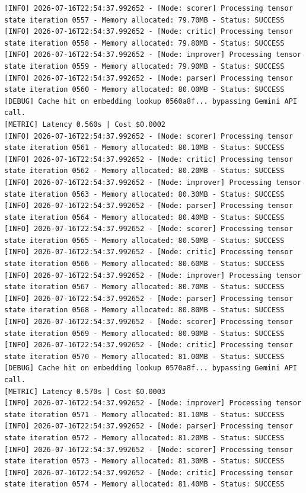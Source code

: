 \documentclass[10pt,journal,compsoc]{IEEEtran}
\begin{document}
\begin{verbatim}
[INFO] 2026-07-16T22:54:37.992652 - [Node: scorer] Processing tensor state iteration 0557 - Memory allocated: 79.70MB - Status: SUCCESS
[INFO] 2026-07-16T22:54:37.992652 - [Node: critic] Processing tensor state iteration 0558 - Memory allocated: 79.80MB - Status: SUCCESS
[INFO] 2026-07-16T22:54:37.992652 - [Node: improver] Processing tensor state iteration 0559 - Memory allocated: 79.90MB - Status: SUCCESS
[INFO] 2026-07-16T22:54:37.992652 - [Node: parser] Processing tensor state iteration 0560 - Memory allocated: 80.00MB - Status: SUCCESS
[DEBUG] Cache hit on embedding lookup 0560a8f... bypassing Gemini API call.
[METRIC] Latency 0.560s | Cost $0.0002
[INFO] 2026-07-16T22:54:37.992652 - [Node: scorer] Processing tensor state iteration 0561 - Memory allocated: 80.10MB - Status: SUCCESS
[INFO] 2026-07-16T22:54:37.992652 - [Node: critic] Processing tensor state iteration 0562 - Memory allocated: 80.20MB - Status: SUCCESS
[INFO] 2026-07-16T22:54:37.992652 - [Node: improver] Processing tensor state iteration 0563 - Memory allocated: 80.30MB - Status: SUCCESS
[INFO] 2026-07-16T22:54:37.992652 - [Node: parser] Processing tensor state iteration 0564 - Memory allocated: 80.40MB - Status: SUCCESS
[INFO] 2026-07-16T22:54:37.992652 - [Node: scorer] Processing tensor state iteration 0565 - Memory allocated: 80.50MB - Status: SUCCESS
[INFO] 2026-07-16T22:54:37.992652 - [Node: critic] Processing tensor state iteration 0566 - Memory allocated: 80.60MB - Status: SUCCESS
[INFO] 2026-07-16T22:54:37.992652 - [Node: improver] Processing tensor state iteration 0567 - Memory allocated: 80.70MB - Status: SUCCESS
[INFO] 2026-07-16T22:54:37.992652 - [Node: parser] Processing tensor state iteration 0568 - Memory allocated: 80.80MB - Status: SUCCESS
[INFO] 2026-07-16T22:54:37.992652 - [Node: scorer] Processing tensor state iteration 0569 - Memory allocated: 80.90MB - Status: SUCCESS
[INFO] 2026-07-16T22:54:37.992652 - [Node: critic] Processing tensor state iteration 0570 - Memory allocated: 81.00MB - Status: SUCCESS
[DEBUG] Cache hit on embedding lookup 0570a8f... bypassing Gemini API call.
[METRIC] Latency 0.570s | Cost $0.0003
[INFO] 2026-07-16T22:54:37.992652 - [Node: improver] Processing tensor state iteration 0571 - Memory allocated: 81.10MB - Status: SUCCESS
[INFO] 2026-07-16T22:54:37.992652 - [Node: parser] Processing tensor state iteration 0572 - Memory allocated: 81.20MB - Status: SUCCESS
[INFO] 2026-07-16T22:54:37.992652 - [Node: scorer] Processing tensor state iteration 0573 - Memory allocated: 81.30MB - Status: SUCCESS
[INFO] 2026-07-16T22:54:37.992652 - [Node: critic] Processing tensor state iteration 0574 - Memory allocated: 81.40MB - Status: SUCCESS

\end{verbatim}
\end{document}
